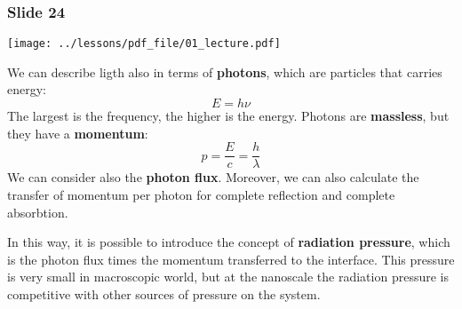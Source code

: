 \documentclass[../main/main.tex]{subfiles}
\begin{document}
\subsubsection*{Slide 24}

\begin{minipage}[]{0.5\linewidth}
\centering
\texttt{[image: ../lessons/pdf\_file/01\_lecture.pdf]}
\end{minipage}
\hspace{0.3cm}\vspace{0.3cm}
\begin{minipage}[c]{0.47\linewidth}
We can describe ligth also in terms of \textbf{photons}, which are particles that carries energy:
\begin{equation*}
  E = h \nu
\end{equation*}
The largest is the frequency, the higher is the energy. Photons are \textbf{massless}, but they have a \textbf{momentum}:
\begin{equation*}
  p = \frac{E}{c} = \frac{h}{\lambda }
\end{equation*}
We can consider also the \textbf{photon flux}. Moreover, we can also calculate the transfer of momentum per photon for complete reflection and complete absorbtion.
\end{minipage}

In this way, it is possible to introduce the concept of \textbf{radiation pressure}, which is the photon flux times the momentum transferred to the interface. This pressure is very small in macroscopic world, but at the nanoscale the radiation pressure is competitive with other sources of pressure on the system.
\end{document}
